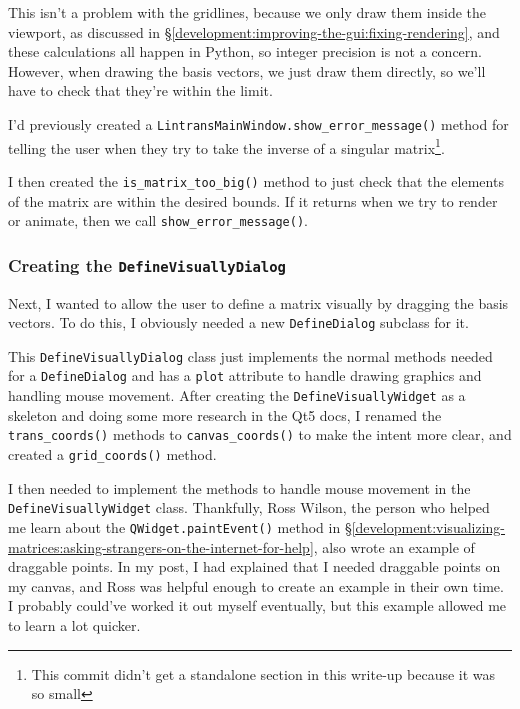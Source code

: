 \documentclass[../development.tex]{subfiles}
\begin{document}
This isn't a problem with the gridlines, because we only draw them inside the viewport, as discussed in \S\ref{development:improving-the-gui:fixing-rendering}, and these calculations all happen in Python, so integer precision is not a concern. However, when drawing the basis vectors, we just draw them directly, so we'll have to check that they're within the limit.

I'd previously created a \texttt{LintransMainWindow.show\_error\_message()} method for telling the user when they try to take the inverse of a singular matrix\footnote{This commit didn't get a standalone section in this write-up because it was so small}.


I then created the \texttt{is\_matrix\_too\_big()} method to just check that the elements of the matrix are within the desired bounds. If it returns  when we try to render or animate, then we call \texttt{show\_error\_message()}.


\subsubsection{Creating the \texttt{DefineVisuallyDialog}\label{development:improving-the-gui:creating-the-DefineVisuallyDialog}}

Next, I wanted to allow the user to define a matrix visually by dragging the basis vectors. To do this, I obviously needed a new \texttt{DefineDialog} subclass for it.


This \texttt{DefineVisuallyDialog} class just implements the normal methods needed for a \texttt{DefineDialog} and has a \texttt{plot} attribute to handle drawing graphics and handling mouse movement. After creating the \texttt{DefineVisuallyWidget} as a skeleton and doing some more research in the Qt5 docs\cite{qt5-docs-qwidget-mousemoveevent}, I renamed the \texttt{trans\_coords()} methods to \texttt{canvas\_coords()} to make the intent more clear, and created a \texttt{grid\_coords()} method.


I then needed to implement the methods to handle mouse movement in the \texttt{DefineVisuallyWidget} class. Thankfully, Ross Wilson, the person who helped me learn about the \texttt{QWidget.paintEvent()} method in \S\ref{development:visualizing-matrices:asking-strangers-on-the-internet-for-help}, also wrote an example of draggable points\cite{gitlab-custom-widgets-ijvectors.py}. In my post, I had explained that I needed draggable points on my canvas, and Ross was helpful enough to create an example in their own time. I probably could've worked it out myself eventually, but this example allowed me to learn a lot quicker.
\end{document}
